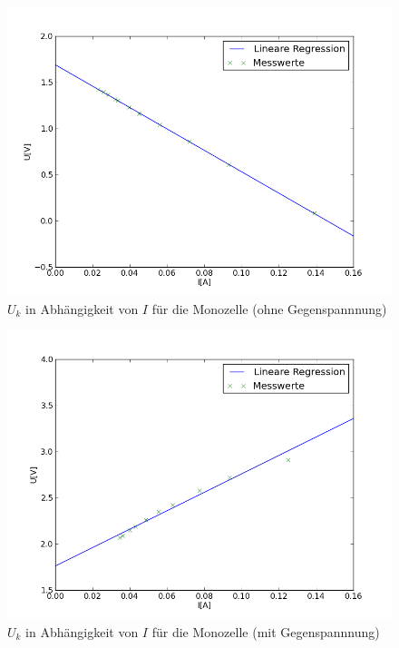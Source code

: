 \documentclass[11pt,ngerman,a4paper]{article}
\begin{document}
\begin{figure}
\centering
\includegraphics[scale=1.00]{Plot1.png}
\caption{$U_k$ in Abh\"angigkeit von $I$ f\"ur die Monozelle (ohne Gegenspannnung)}
\label{Plot1}
\end{figure}
\begin{figure}
\centering
\includegraphics[scale=1.00]{Plot5.png}
\caption{$U_k$ in Abh\"angigkeit von $I$ f\"ur die Monozelle (mit Gegenspannnung)}
\label{Plot1}
\end{figure}
\end{document}

